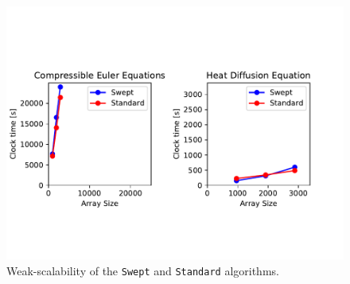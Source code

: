 \documentclass[journal,article,submit,moreauthors,pdftex]{Definitions/mdpi}
\def\Swept{\texttt{Swept}}
\def\Standard{\texttt{Standard}}
\newcommand\fs{1}
\begin{document}
\begin{figure}
    \widefigure
    \begin{center}
        \includegraphics[scale=\fs, trim={0.7cm 2.5cm 1.5cm 1.5cm},clip]{figs/weakScalability.pdf}
        \caption{Weak-scalability of the \Swept{} and \Standard{} algorithms.}
        \label{fig:scalability}
    \end{center}
\end{figure}
\end{document}
